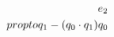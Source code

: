 \documentclass[preview]{standalone}
\begin{document}
\begin{align*}
\special{dvisvgm:raw <g id='unique000'>}e_2 \\propto q_1 - (q_0\cdot q_1)q_0\special{dvisvgm:raw </g>}
\end{align*}
\end{document}
